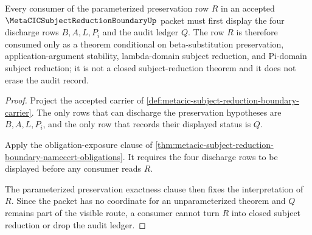 \begin{theorem}
\label{thm:metacic-subject-reduction-boundary-obligation-exposure}
Every consumer of the parameterized preservation row $R$ in an accepted $\MetaCICSubjectReductionBoundaryUp$ packet must first display the four discharge rows $B,A,L,P_i$ and the audit ledger $Q$. The row $R$ is therefore consumed only as a theorem conditional on beta-substitution preservation, application-argument stability, lambda-domain subject reduction, and Pi-domain subject reduction; it is not a closed subject-reduction theorem and it does not erase the audit record.
\end{theorem}
\begin{proof}
Project the accepted carrier of \autoref{def:metacic-subject-reduction-boundary-carrier}. The only rows that can discharge the preservation hypotheses are $B,A,L,P_i$, and the only row that records their displayed status is $Q$.

Apply the obligation-exposure clause of \autoref{thm:metacic-subject-reduction-boundary-namecert-obligations}. It requires the four discharge rows to be displayed before any consumer reads $R$.

The parameterized preservation exactness clause then fixes the interpretation of $R$. Since the packet has no coordinate for an unparameterized theorem and $Q$ remains part of the visible route, a consumer cannot turn $R$ into closed subject reduction or drop the audit ledger.
\end{proof}

